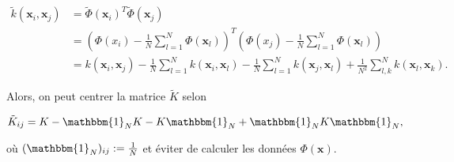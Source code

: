 \begin{align*}
\tilde{k}(\textbf{x}_i, \textbf{x}_j) &= \tilde{\Phi}(\textbf{x}_i)^T\tilde{\Phi}(\textbf{x}_j)\\
&= \left( \Phi(x_i) - \frac{1}{N}\sum_{l = 1}^{N}\Phi(\textbf{x}_l) \right)^T \left(\Phi(x_j) - \frac{1}{N}\sum_{l = 1}^{N}\Phi(\textbf{x}_l)\right)\\
&= k(\textbf{x}_i, \textbf{x}_j) - \frac{1}{N}\sum_{l = 1}^{N}k(\textbf{x}_i, \textbf{x}_l) - \frac{1}{N}\sum_{l = 1}^{N}k(\textbf{x}_j, \textbf{x}_l) + \frac{1}{N^2} \sum_{l, k}^{N}k(\textbf{x}_l, \textbf{x}_k).
\end{align*}

Alors, on peut centrer la matrice $\tilde{K}$ selon

\begin{equation*}
\tilde{K}_{ij} = K - \mathbbm{1}_NK - K\mathbbm{1}_N + \mathbbm{1}_NK\mathbbm{1}_N,
\end{equation*}

où $(\mathbbm{1}_N)_{ij} := \frac{1}{N}$ et éviter de calculer les données $\Phi(\textbf{x})$. 

